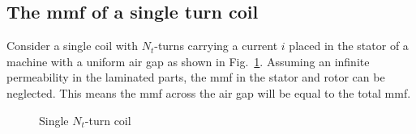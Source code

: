 \subsection{The mmf of a single turn coil}%
\label{subsec:nt-turn_coil}
Consider a single coil with $N_t$-turns carrying a current $i$ placed in the stator of a machine with a uniform air gap as shown in Fig.~\ref{fig:mmf_1}. Assuming an infinite permeability in the laminated parts, the mmf in the stator and rotor can be neglected. This means the mmf across the air gap will be equal to the total mmf. 
 
\begin{figure}[htbp]
  \centering
  \fontsize{8}{10}\selectfont
  \hfill
  \caption{Single $N_t$-turn coil}
  \label{fig:mmf_1}
\end{figure}


